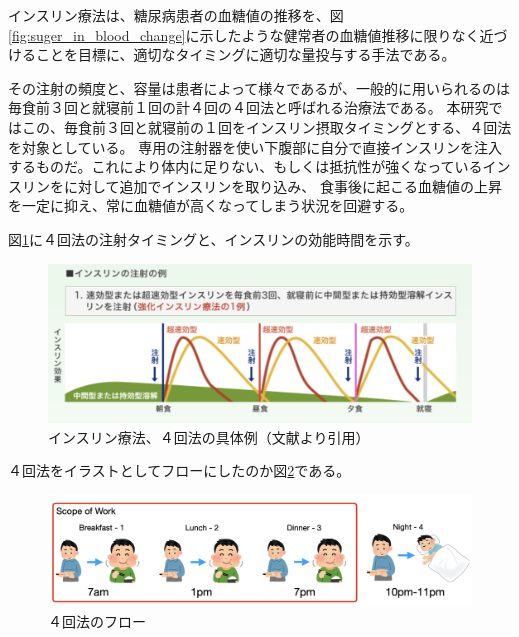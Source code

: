 インスリン療法は、糖尿病患者の血糖値の推移を、図\ref{fig:suger_in_blood_change}に示したような健常者の血糖値推移に限りなく近づけることを目標に、適切なタイミングに適切な量投与する手法である。

その注射の頻度と、容量は患者によって様々であるが、一般的に用いられるのは毎食前３回と就寝前１回の計４回の４回法と呼ばれる治療法である。\cite{insulin_treatment_method}\cite{diabetes_treatment_type1}
本研究ではこの、毎食前３回と就寝前の１回をインスリン摂取タイミングとする、４回法を対象としている。
専用の注射器を使い下腹部に自分で直接インスリンを注入するものだ。これにより体内に足りない、もしくは抵抗性が強くなっているインスリンをに対して追加でインスリンを取り込み、
食事後に起こる血糖値の上昇を一定に抑え、常に血糖値が高くなってしまう状況を回避する。

図\ref{fig:insulin_4times_method}に４回法の注射タイミングと、インスリンの効能時間を示す。

\begin{figure}[htbp]
  \caption{インスリン療法、４回法の具体例（文献\cite{insulin_4times_method}より引用）}
  \label{fig:insulin_4times_method}
  \begin{center}
    \includegraphics[bb=0 0 700 300,width=15cm]{assets/insulin_4times_method.png}
  \end{center}
\end{figure}

４回法をイラストとしてフローにしたのか図\ref{fig:insulin_4times_method_flow}である。

\begin{figure}[htbp]
  \caption{４回法のフロー}
  \label{fig:insulin_4times_method_flow}
  \begin{center}
    \includegraphics[bb=0 0 1000 300,width=15cm]{assets/insulin_4times_method_flow.png}
  \end{center}
\end{figure}

